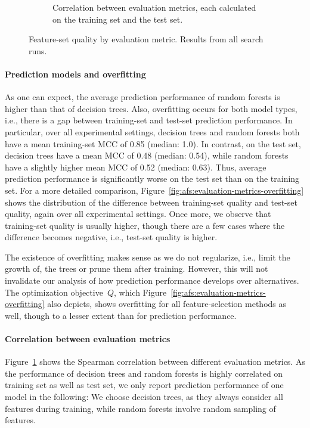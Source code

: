 \documentclass{article}
\theoremstyle{definition}
\begin{document}
\begin{figure}[htb]
\begin{subfigure}[t]{0.48\textwidth}
		\caption{Correlation between evaluation metrics, each calculated on the training set and the test set.}
		\label{fig:afs:evaluation-metrics-correlation}
	\end{subfigure}
	\caption{
		Feature-set quality by evaluation metric.
		Results from all search runs.
	}
	\label{fig:afs:evaluation-metrics}
\end{figure}

\paragraph{Prediction models and overfitting}

As one can expect, the average prediction performance of random forests is higher than that of decision trees.
Also, overfitting occurs for both model types, i.e., there is a gap between training-set and test-set prediction performance.
In particular, over all experimental settings, decision trees and random forests both have a mean training-set MCC of 0.85 (median: 1.0).
In contrast, on the test set, decision trees have a mean MCC of 0.48 (median: 0.54), while random forests have a slightly higher mean MCC of 0.52 (median: 0.63).
Thus, average prediction performance is significantly worse on the test set than on the training set.
For a more detailed comparison, Figure~\ref{fig:afs:evaluation-metrics-overfitting} shows the distribution of the difference between training-set quality and test-set quality, again over all experimental settings.
Once more, we observe that training-set quality is usually higher, though there are a few cases where the difference becomes negative, i.e., test-set quality is higher.

The existence of overfitting makes sense as we do not regularize, i.e., limit the growth of, the trees or prune them after training.
However, this will not invalidate our analysis of how prediction performance develops over alternatives.
The optimization objective~$Q$, which Figure~\ref{fig:afs:evaluation-metrics-overfitting} also depicts, shows overfitting for all feature-selection methods as well, though to a lesser extent than for prediction performance.

\paragraph{Correlation between evaluation metrics}

Figure~\ref{fig:afs:evaluation-metrics-correlation} shows the Spearman correlation between different evaluation metrics.
As the performance of decision trees and random forests is highly correlated on training set as well as test set, we only report prediction performance of one model in the following:
We choose decision trees, as they always consider all features during training, while random forests involve random sampling of features.
\end{document}
